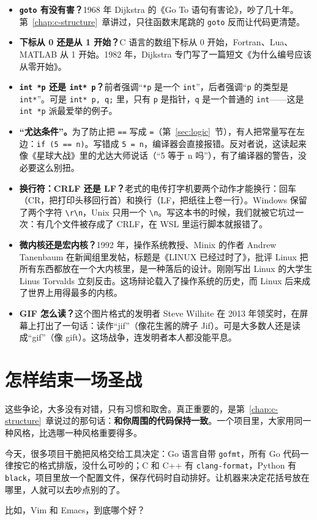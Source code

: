 \begin{itemize}
  \item \textbf{\texttt{goto} 有没有害？}1968 年 Dijkstra 的《Go To 语句有害论》，吵了几十年。第~\ref{chap:c-structure}~章讲过，只往函数末尾跳的 \texttt{goto} 反而让代码更清楚。
  \item \textbf{下标从 0 还是从 1 开始？}C 语言的数组下标从 0 开始，Fortran、Lua、MATLAB 从 1 开始。1982 年，Dijkstra 专门写了一篇短文《为什么编号应该从零开始》。
  \item \textbf{\texttt{int *p} 还是 \texttt{int* p}？}前者强调“\texttt{*p} 是一个 \texttt{int}”，后者强调“\texttt{p} 的类型是 \texttt{int*}”。可是 \texttt{int* p, q;} 里，只有 \texttt{p} 是指针，\texttt{q} 是一个普通的 \texttt{int}——这是 \texttt{int *p} 派最爱举的例子。
  \item \textbf{“尤达条件”。}为了防止把 \texttt{==} 写成 \texttt{=}（第~\ref{sec:logic}~节），有人把常量写在左边：\texttt{if (5 == n)}。写错成 \texttt{5 = n}，编译器会直接报错。反对者说，这读起来像《星球大战》里的尤达大师说话（“5 等于 n 吗”），有了编译器的警告，没必要这么别扭。
  \item \textbf{换行符：CRLF 还是 LF？}老式的电传打字机要两个动作才能换行：回车（CR，把打印头移回行首）和换行（LF，把纸往上卷一行）。Windows 保留了两个字符 \texttt{\textbackslash r\textbackslash n}，Unix 只用一个 \texttt{\textbackslash n}。写这本书的时候，我们就被它坑过一次：有几个文件被存成了 CRLF，在 WSL 里运行脚本就报错了。
  \item \textbf{微内核还是宏内核？}1992 年，操作系统教授、Minix 的作者 Andrew Tanenbaum 在新闻组里发帖，标题是《LINUX 已经过时了》，批评 Linux 把所有东西都放在一个大内核里，是一种落后的设计。刚刚写出 Linux 的大学生 Linus Torvalds 立刻反击。这场辩论载入了操作系统的历史，而 Linux 后来成了世界上用得最多的内核。
  \item \textbf{GIF 怎么读？}这个图片格式的发明者 Steve Wilhite 在 2013 年领奖时，在屏幕上打出了一句话：读作“jif”（像花生酱的牌子 Jif）。可是大多数人还是读成“gif”（像 gift）。这场战争，连发明者本人都没能平息。
\end{itemize}

\section{怎样结束一场圣战}

这些争论，大多没有对错，只有习惯和取舍。真正重要的，是第~\ref{chap:c-structure}~章说过的那句话：\textbf{和你周围的代码保持一致}。一个项目里，大家用同一种风格，比选哪一种风格重要得多。

今天，很多项目干脆把风格交给工具决定：Go 语言自带 \texttt{gofmt}，所有 Go 代码一律按它的格式排版，没什么可吵的；C 和 C++ 有 \texttt{clang-format}，Python 有 \texttt{black}，项目里放一个配置文件，保存代码时自动排好。让机器来决定花括号放在哪里，人就可以去吵点别的了。

比如，Vim 和 Emacs，到底哪个好？
